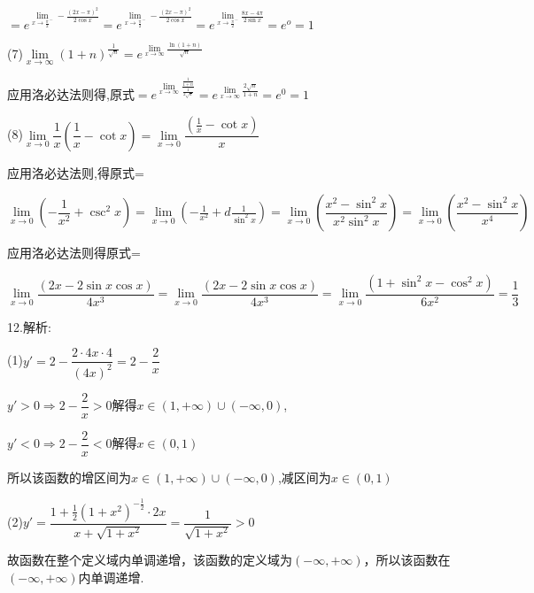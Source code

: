 $ = {e^{\mathop {\lim }\limits_{x \to {{\frac{\pi }{2}}^ - }}  - \frac{{{{(2x - \pi )}^2}}}{{2\cos x}}}} = {e^{\mathop {\lim }\limits_{x \to {{\frac{\pi }{2}}^ - }}  - \frac{{{{(2x - \pi )}^2}}}{{2\cos x}}}} = {e^{\mathop {\lim }\limits_{x \to {{\frac{\pi }{2}}^ - }} \frac{{8x - 4\pi }}{{2\sin x}}}} = {e^o} = 1$

(7)$\mathop {\lim }\limits_{x \to \infty } {\left( {1 + n} \right)^{\frac{1}{{\sqrt n }}}} = {e^{\mathop {\lim }\limits_{x \to \infty } \frac{{\ln \left( {1 + n} \right)}}{{\sqrt n }}}}$

应用洛必达法则得,原式$ = {e^{\mathop {\lim }\limits_{x \to \infty } \frac{{\frac{1}{{1 + n}}}}{{\frac{1}{{2\sqrt n }}}}}} = {e^{\mathop {\lim }\limits_{x \to \infty } \frac{{2\sqrt n }}{{1 + n}}}} = {e^0} = 1$

(8)$\lim\limits_{x \to 0}  \dfrac{1}{x}(\dfrac{1}{x} - \cot x) = \lim\limits_{x \to 0}  \dfrac{{(\frac{1}{x} - \cot x)}}{x}$

应用洛必达法则,得原式=

$\lim\limits_{x \to 0}  \left( { - \dfrac{1}{{{x^2}}} + {{\csc }^2}x} \right) = \lim\limits_{x \to 0}  \left( { - \frac{1}{{{x^2}}} + d\frac{1}{{{{\sin }^2}x}}} \right) = \lim\limits_{x \to 0}  \left( {\dfrac{{{x^2} - {{\sin }^2}x}}{{{x^2}{{\sin }^2}x}}} \right) = \lim\limits_{x \to 0}  \left( {\dfrac{{{x^2} - {{\sin }^2}x}}{{{x^4}}}} \right)$

应用洛必达法则得原式=

$\lim\limits_{x \to 0}  \dfrac{{(2x - 2\sin x\cos x)}}{{4{x^3}}} = \lim\limits_{x \to 0}  \dfrac{{(2x - 2\sin x\cos x)}}{{4{x^3}}} = \lim\limits_{x \to 0}  \dfrac{{(1 + {{\sin }^2}x - {{\cos }^2}x)}}{{6{x^2}}} = \dfrac{1}{3}$

12.解析:

(1)$y' = 2 - \dfrac{{2 \cdot 4x \cdot 4}}{{{{(4x)}^2}}} = 2 - \dfrac{2}{x}$

$y' > 0 \Rightarrow 2 - \dfrac{2}{x} > 0$解得$x \in (1, + \infty ) \cup ( - \infty ,0)$,

$y' < 0 \Rightarrow 2 - \dfrac{2}{x} < 0$解得$x \in (0,1)$

所以该函数的增区间为$x \in (1, + \infty ) \cup ( - \infty ,0)$,减区间为$x \in (0,1)$

(2)$y' = \dfrac{{1 + \frac{1}{2}{{(1 + {x^2})}^{ - \frac{1}{2}}} \cdot 2x}}{{x + \sqrt {1 + {x^2}} }} = \dfrac{1}{{\sqrt {1 + {x^2}} }} > 0$

故函数在整个定义域内单调递增，该函数的定义域为$( - \infty , + \infty )$，所以该函数在$( - \infty , + \infty )$内单调递增.

